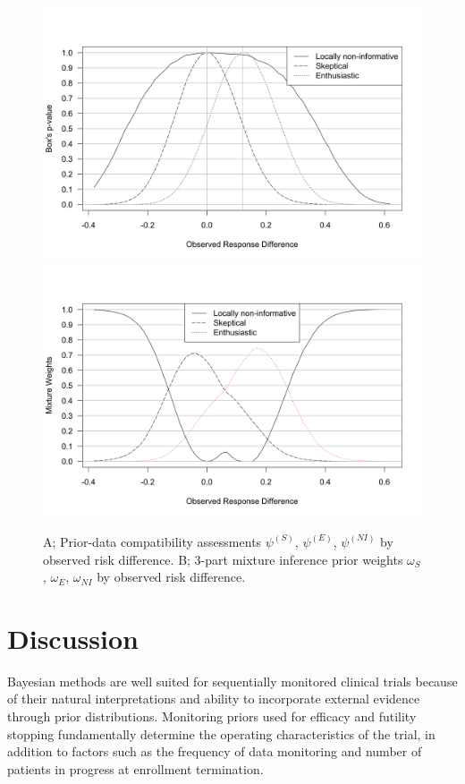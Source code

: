 \documentclass[useAMS,usenatbib,referee]{biom}
\begin{document}
\begin{figure}\begin{center}
\includegraphics[width=6in]{3-part-compatibility-1.png}
\includegraphics[width=6in]{3-part-compatibility-2.png}
    \caption{A; Prior-data compatibility assessments $\psi^{(S)}$, $\psi^{(E)}$, $\psi^{(NI)}$ by observed risk difference. B; 3-part mixture inference prior weights $\omega_S$, $\omega_{E}$, $\omega_{NI}$ by observed risk difference.}
\label{fig:3-part-compatibility}
 \end{center}
\end{figure}

\section{Discussion}
Bayesian methods are well suited for sequentially monitored clinical trials because of their natural interpretations and ability to incorporate external evidence through prior distributions. 
%
Monitoring priors used for efficacy and futility stopping fundamentally determine the operating characteristics of the trial, in addition to factors such as the frequency of data monitoring and number of patients in progress at enrollment termination. 
\end{document}

